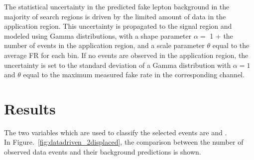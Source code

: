 The statistical uncertainty in the predicted fake lepton background
in the majority of search regions is driven by the limited
amount of data in the application region. This uncertainty
is propagated to the signal region and modeled using
Gamma distributions, with a shape parameter $\alpha =$ 1 +  the
number of events in the application region, and a scale parameter $\theta$ equal
to the average FR for each bin.
If no events are observed in the application region, the uncertainty is
set to the standard deviation of a Gamma distribution with $\alpha =
1$ and $\theta$ equal to the maximum measured fake rate in the
corresponding channel. 

\clearpage
\section{Results}\label{sec:llresults}
The two variables which are used to classify the selected events are \Deltwod and
\mtwol.\\
In Figure.~\ref{fig:datadriven_2displaced},
the comparison between the number of observed data events and their background
predictions is shown.


